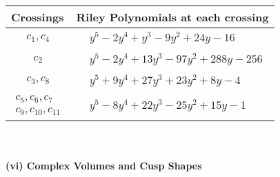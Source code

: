\documentclass[1p]{elsarticle_modified}
\theoremstyle{definition}
\begin{document}
\begin{tabular}{m{50pt}|m{274pt}}
Crossings & \hspace{64pt}Riley Polynomials at each crossing \\
\hline $$\begin{aligned}c_{1},c_{4}\end{aligned}$$&$\begin{aligned}
&y^5-2 y^4+y^3-9 y^2+24 y-16
\end{aligned}$\\
\hline $$\begin{aligned}c_{2}\end{aligned}$$&$\begin{aligned}
&y^5-2 y^4+13 y^3-97 y^2+288 y-256
\end{aligned}$\\
\hline $$\begin{aligned}c_{3},c_{8}\end{aligned}$$&$\begin{aligned}
&y^5+9 y^4+27 y^3+23 y^2+8 y-4
\end{aligned}$\\
\hline $$\begin{aligned}c_{5},c_{6},c_{7}\\c_{9},c_{10},c_{11}\end{aligned}$$&$\begin{aligned}
&y^5-8 y^4+22 y^3-25 y^2+15 y-1
\end{aligned}$\\
\hline
\end{tabular}\\~\\
\newpage\flushleft \textbf{(vi) Complex Volumes and Cusp Shapes}
\end{document}
